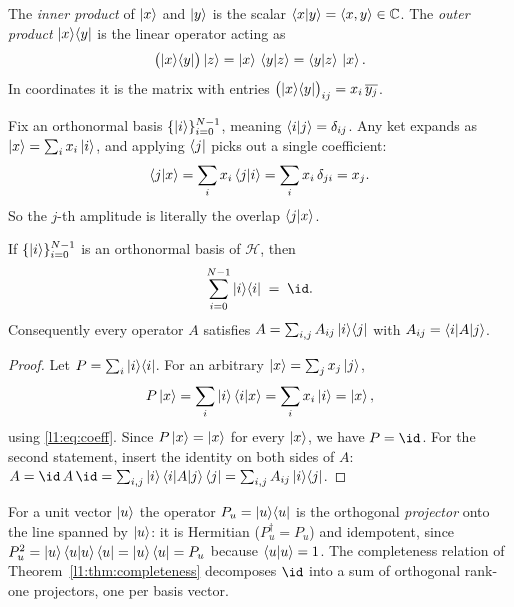\begin{definition}\label{l1:def:inout}
The \emph{inner product} of $\ket{x}$ and $\ket{y}$ is the scalar
$\braket{x|y}=\langle x,y\rangle\in\mathbb{C}$. The \emph{outer product} $\ket{x}\!\bra{y}$ is
the linear operator acting as
\[
  \bigl(\ket{x}\!\bra{y}\bigr)\ket{z}=\ket{x}\,\braket{y|z}
  =\braket{y|z}\,\ket{x}.
\]
In coordinates it is the matrix with entries $\bigl(\ket{x}\!\bra{y}\bigr)_{ij}=x_i\,\overline{y_j}$.
\end{definition}

Fix an orthonormal basis $\{\ket{i}\}_{i=0}^{N-1}$, meaning $\braket{i|j}=\delta_{ij}$.
Any ket expands as $\ket{x}=\sum_i x_i\ket{i}$, and applying $\bra{j}$ picks out a
single coefficient:
\begin{equation}\label{l1:eq:coeff}
  \braket{j|x}=\sum_i x_i\braket{j|i}=\sum_i x_i\,\delta_{ji}=x_j .
\end{equation}
So the $j$-th amplitude is literally the overlap $\braket{j|x}$.

\begin{theorem}\label{l1:thm:completeness}
If $\{\ket{i}\}_{i=0}^{N-1}$ is an orthonormal basis of $\mathcal{H}$, then
\begin{equation}
  \sum_{i=0}^{N-1}\ketbra{i}{i}\;=\;\id .
\end{equation}
Consequently every operator $A$ satisfies $A=\sum_{i,j}A_{ij}\ket{i}\!\bra{j}$ with
$A_{ij}=\braket{i|A|j}$.
\end{theorem}

\begin{proof}
Let $P=\sum_i\ket{i}\!\bra{i}$. For an arbitrary $\ket{x}=\sum_j x_j\ket{j}$,
\[
  P\ket{x}=\sum_i\ket{i}\braket{i|x}=\sum_i x_i\ket{i}=\ket{x},
\]
using \eqref{l1:eq:coeff}. Since $P\ket{x}=\ket{x}$ for every $\ket{x}$, we have
$P=\id$. For the second statement, insert the identity on both sides of $A$:
$A=\id\,A\,\id=\sum_{i,j}\ket{i}\braket{i|A|j}\bra{j}=\sum_{i,j}A_{ij}\ketbra{i}{j}$.
\end{proof}

\begin{remark}[Projectors]
For a unit vector $\ket{u}$ the operator $P_u=\ket{u}\!\bra{u}$ is the orthogonal
\emph{projector} onto the line spanned by $\ket{u}$: it is Hermitian
($P_u^{\dagger}=P_u$) and idempotent, since
$P_u^{2}=\ket{u}\braket{u|u}\bra{u}=\ket{u}\bra{u}=P_u$ because $\braket{u|u}=1$.
The completeness relation of Theorem~\ref{l1:thm:completeness} decomposes $\id$ into a
sum of orthogonal rank-one projectors, one per basis vector.
\end{remark}

